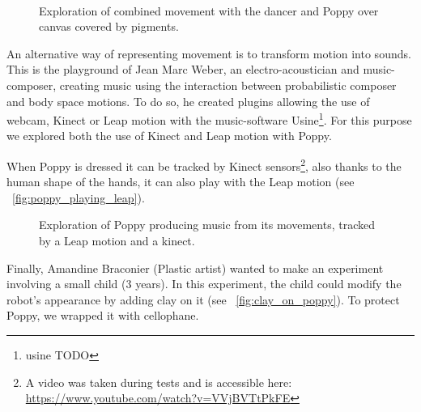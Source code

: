 \begin{figure}[tb]
\centering
    \hfill
    \\
    \hfill
    \caption{Exploration of combined movement with the dancer and Poppy over canvas covered by pigments.}
    \label{fig:residency_canvas}
\end{figure}

An alternative way of representing movement is to transform motion into sounds. This is the playground of Jean Marc Weber, an electro-acoustician and music-composer, creating music using the interaction between probabilistic composer and body space motions. To do so, he created plugins allowing the use of webcam, Kinect or Leap motion with the music-software Usine\footnote{usine TODO}. For this purpose we explored both the use of Kinect and Leap motion with Poppy.

When Poppy is dressed it can be tracked by Kinect sensors\footnote{A video was taken during tests and is accessible here: \url{https://www.youtube.com/watch?v=VVjBVTtPkFE}}, also thanks to the human shape of the hands, it can also play with the Leap motion (see \figurename~\ref{fig:poppy_playing_leap}).

\begin{figure}[tb]
\centering
    \hfil
    \caption{Exploration of Poppy producing music from its movements, tracked by a Leap motion and a kinect.}

\end{figure}

Finally, Amandine Braconier (Plastic artist) wanted to make an experiment involving a small child (3 years). In this experiment, the child could modify the robot’s appearance by adding clay on it (see \figurename~\ref{fig:clay_on_poppy}). To protect Poppy, we wrapped it with cellophane.


